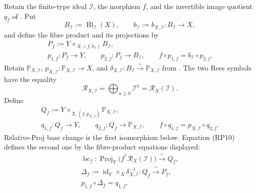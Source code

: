 \begin{definition}
  \label{def:nagata-blowup-universal-lift}
  \lean{}

  Retain the finite-type ideal $\mathcal I$, the morphism $f$, and the
  invertible image quotient $q_f$ of
  .  Put
  \[
    B_{\mathcal I}:=\operatorname{Bl}_{\mathcal I}(X),\qquad
    b_{\mathcal I}:=b_{X,\mathcal I}\colon B_{\mathcal I}\to X,
  \]
  and define the fibre product and its projections by
  \[
  \begin{gathered}
    P_f:=Y\times_{X,(f,b_{\mathcal I})}B_{\mathcal I},\\
    p_{1,f}\colon P_f\to Y,\qquad
    p_{2,f}\colon P_f\to B_{\mathcal I},\qquad
    f\circ p_{1,f}=b_{\mathcal I}\circ p_{2,f}.
  \end{gathered}
  \tag{UL0}
  \]
  Retain $\mathbb P_{X,\mathcal I}$,
  $p_{X,\mathcal I}\colon\mathbb P_{X,\mathcal I}\to X$, and
  $\delta_{X,\mathcal I}\colon B_{\mathcal I}\xrightarrow{\sim}
  \mathbb P_{X,\mathcal I}$ from
  .  The two Rees
  symbols have the equality
  \[
    \mathscr R_{X,\mathcal I}
      =\bigoplus_{n\ge0}\mathcal I^n
      =\mathcal R_X(\mathcal I).                              \tag{UL0a}
  \]
  Define
  \[
  \begin{gathered}
    Q_f:=Y\times_{X,(f,p_{X,\mathcal I})}\mathbb P_{X,\mathcal I},\\
    q_{1,f}\colon Q_f\to Y,\qquad
    q_{2,f}\colon Q_f\to\mathbb P_{X,\mathcal I},\qquad
    f\circ q_{1,f}=p_{X,\mathcal I}\circ q_{2,f}.
  \end{gathered}                                               \tag{UL0b}
  \]
  Relative-Proj base change
  \cite[\href{https://stacks.math.columbia.edu/tag/01O3}{Tag 01O3}]
  {stacks-project} is the first isomorphism below.  Equation (RP10) defines
  the second one by the fibre-product equations displayed:
  \[
  \begin{gathered}
    \operatorname{bc}_f\colon
      \operatorname{Proj}_Y\!\bigl(f^*\mathcal R_X(\mathcal I)\bigr)
      \xrightarrow{\ \sim\ }Q_f,\\
    \Delta_f:=
      \operatorname{id}_Y\times_X\delta_{X,\mathcal I}^{-1}
      \colon Q_f\xrightarrow{\ \sim\ }P_f,\\
    p_{1,f}\circ\Delta_f=q_{1,f},\qquad

\end{gathered}\]
\end{definition}
